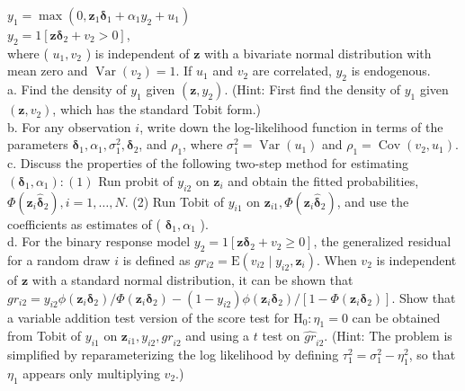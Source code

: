 \documentclass[10pt]{article}
\begin{document}
$y_{1}=\max \left(0, \mathbf{z}_{1} \boldsymbol{\delta}_{1}+\alpha_{1} y_{2}+u_{1}\right)$\\
$y_{2}=1\left[\mathbf{z} \boldsymbol{\delta}_{2}+v_{2}>0\right]$,\\
where ( $u_{1}, v_{2}$ ) is independent of $\mathbf{z}$ with a bivariate normal distribution with mean zero and $\operatorname{Var}\left(v_{2}\right)=1$. If $u_{1}$ and $v_{2}$ are correlated, $y_{2}$ is endogenous.\\
a. Find the density of $y_{1}$ given $\left(\mathbf{z}, y_{2}\right)$. (Hint: First find the density of $y_{1}$ given $\left(\mathbf{z}, v_{2}\right)$, which has the standard Tobit form.)\\
b. For any observation $i$, write down the log-likelihood function in terms of the parameters $\boldsymbol{\delta}_{1}, \alpha_{1}, \sigma_{1}^{2}, \boldsymbol{\delta}_{2}$, and $\rho_{1}$, where $\sigma_{1}^{2}=\operatorname{Var}\left(u_{1}\right)$ and $\rho_{1}=\operatorname{Cov}\left(v_{2}, u_{1}\right)$.\\
c. Discuss the properties of the following two-step method for estimating $\left(\boldsymbol{\delta}_{1}, \alpha_{1}\right):(1)$ Run probit of $y_{i 2}$ on $\mathbf{z}_{i}$ and obtain the fitted probabilities, $\Phi\left(\mathbf{z}_{i} \hat{\boldsymbol{\delta}}_{2}\right), i=1, \ldots, N$. (2) Run Tobit of $y_{i 1}$ on $\mathbf{z}_{i 1}, \Phi\left(\mathbf{z}_{i} \hat{\boldsymbol{\delta}}_{2}\right)$, and use the coefficients as estimates of ( $\boldsymbol{\delta}_{1}, \alpha_{1}$ ).\\
d. For the binary response model $y_{2}=1\left[\mathbf{z} \boldsymbol{\delta}_{2}+v_{2} \geq 0\right]$, the generalized residual for a random draw $i$ is defined as $g r_{i 2}=\mathrm{E}\left(v_{i 2} \mid y_{i 2}, \mathbf{z}_{i}\right)$. When $v_{2}$ is independent of $\mathbf{z}$ with a standard normal distribution, it can be shown that $g r_{i 2}=y_{i 2} \phi\left(\mathbf{z}_{i} \boldsymbol{\delta}_{2}\right) / \Phi\left(\mathbf{z}_{i} \boldsymbol{\delta}_{2}\right)- \left(1-y_{i 2}\right) \phi\left(\mathbf{z}_{i} \boldsymbol{\delta}_{2}\right) /\left[1-\Phi\left(\mathbf{z}_{i} \boldsymbol{\delta}_{2}\right)\right]$. Show that a variable addition test version of the score test for $\mathrm{H}_{0}: \eta_{1}=0$ can be obtained from Tobit of $y_{i 1}$ on $\mathbf{z}_{i 1}, y_{i 2}, \widehat{g r}_{i 2}$ and using a $t$ test on $\widehat{g r}_{i 2}$. (Hint: The problem is simplified by reparameterizing the log likelihood by defining $\tau_{1}^{2}=\sigma_{1}^{2}-\eta_{1}^{2}$, so that $\eta_{1}$ appears only multiplying $v_{2}$.)\\
\end{document}
